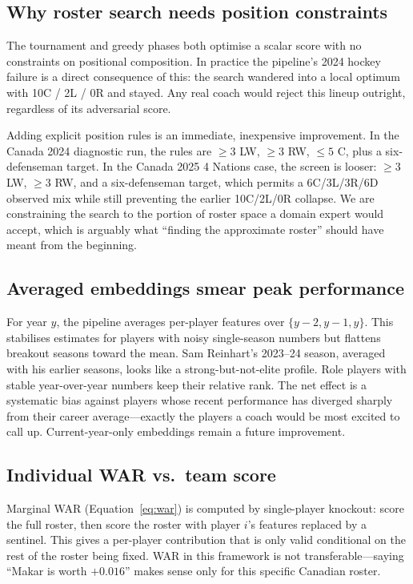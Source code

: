 \documentclass[12pt,letterpaper]{article}
\begin{document}
\subsection{Why roster search needs position constraints}

The tournament and greedy phases both optimise a scalar score with no
constraints on positional composition.
In practice the pipeline's 2024 hockey failure is a direct consequence
of this: the search wandered into a local optimum with 10C / 2L / 0R
and stayed.
Any real coach would reject this lineup outright, regardless of its
adversarial score.

Adding explicit position rules is an immediate, inexpensive improvement.
In the Canada 2024 diagnostic run, the rules are $\geq 3$ LW,
$\geq 3$ RW, $\leq 5$ C, plus a six-defenseman target.
In the Canada 2025 4 Nations case, the screen is looser: $\geq 3$ LW,
$\geq 3$ RW, and a six-defenseman target, which permits a 6C/3L/3R/6D
observed mix while still preventing the earlier 10C/2L/0R collapse.
We are constraining the search to the portion of roster space a domain
expert would accept, which is arguably what ``finding the approximate
roster'' should have meant from the beginning.

\subsection{Averaged embeddings smear peak performance}

For year $y$, the pipeline averages per-player features over
$\{y-2, y-1, y\}$.
This stabilises estimates for players with noisy single-season numbers
but flattens breakout seasons toward the mean.
Sam Reinhart's 2023--24 season, averaged with his earlier seasons,
looks like a strong-but-not-elite profile.
Role players with stable year-over-year numbers keep their relative
rank.
The net effect is a systematic bias against players whose recent
performance has diverged sharply from their career average---exactly
the players a coach would be most excited to call up.
Current-year-only embeddings remain a future improvement.

\subsection{Individual WAR vs.\ team score}

Marginal WAR (Equation~\ref{eq:war}) is computed by single-player
knockout: score the full roster, then score the roster with player
$i$'s features replaced by a sentinel.
This gives a per-player contribution that is only valid conditional on
the rest of the roster being fixed.
WAR in this framework is not transferable---saying ``Makar is worth
$+0.016$'' makes sense only for this specific Canadian roster.
\end{document}
